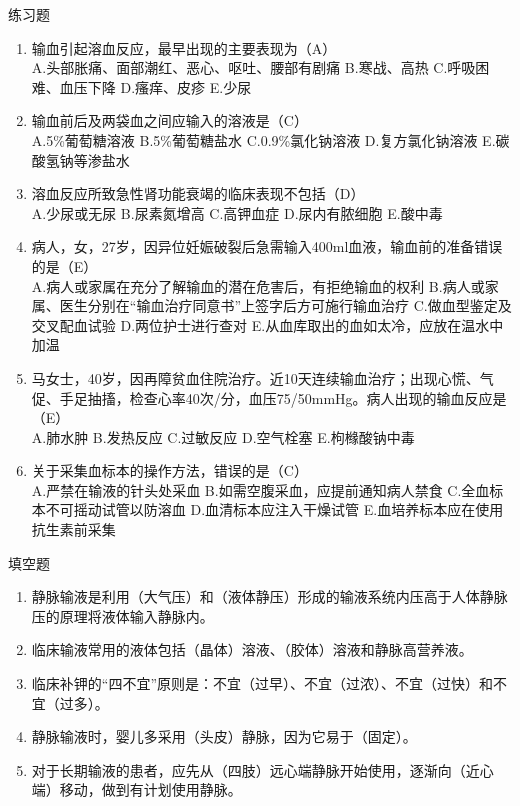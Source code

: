 \documentclass[11pt, a4paper]{ctexart}
\begin{document}
\begin{examplebox}{练习题}
\begin{enumerate}
    \item 输血引起溶血反应，最早出现的主要表现为（A）\\
    A.头部胀痛、面部潮红、恶心、呕吐、腰部有剧痛 \quad B.寒战、高热 \quad C.呼吸困难、血压下降 \quad D.瘙痒、皮疹 \quad E.少尿
    \item 输血前后及两袋血之间应输入的溶液是（C）\\
    A.5\%葡萄糖溶液 \quad B.5\%葡萄糖盐水 \quad C.0.9\%氯化钠溶液 \quad D.复方氯化钠溶液 \quad E.碳酸氢钠等渗盐水
    \item 溶血反应所致急性肾功能衰竭的临床表现不包括（D）\\
    A.少尿或无尿 \quad B.尿素氮增高 \quad C.高钾血症 \quad D.尿内有脓细胞 \quad E.酸中毒
    \item 病人，女，27岁，因异位妊娠破裂后急需输入400ml血液，输血前的准备错误的是（E）\\
    A.病人或家属在充分了解输血的潜在危害后，有拒绝输血的权利 \quad B.病人或家属、医生分别在“输血治疗同意书”上签字后方可施行输血治疗 \quad C.做血型鉴定及交叉配血试验 \quad D.两位护士进行查对 \quad E.从血库取出的血如太冷，应放在温水中加温
    \item 马女士，40岁，因再障贫血住院治疗。近10天连续输血治疗；出现心慌、气促、手足抽搐，检查心率40次/分，血压75/50mmHg。病人出现的输血反应是（E）\\
    A.肺水肿 \quad B.发热反应 \quad C.过敏反应 \quad D.空气栓塞 \quad E.枸橼酸钠中毒
    \item 关于采集血标本的操作方法，错误的是（C）\\
    A.严禁在输液的针头处采血 \quad B.如需空腹采血，应提前通知病人禁食 \quad C.全血标本不可摇动试管以防溶血 \quad D.血清标本应注入干燥试管 \quad E.血培养标本应在使用抗生素前采集
\end{enumerate}
\end{examplebox}

\begin{tipsbox}{填空题}
\begin{enumerate}
    \item 静脉输液是利用（大气压）和（液体静压）形成的输液系统内压高于人体静脉压的原理将液体输入静脉内。
    \item 临床输液常用的液体包括（晶体）溶液、（胶体）溶液和静脉高营养液。
    \item 临床补钾的“四不宜”原则是：不宜（过早）、不宜（过浓）、不宜（过快）和不宜（过多）。
    \item 静脉输液时，婴儿多采用（头皮）静脉，因为它易于（固定）。
    \item 对于长期输液的患者，应先从（四肢）远心端静脉开始使用，逐渐向（近心端）移动，做到有计划使用静脉。
\end{enumerate}
\end{tipsbox}
\end{document}
